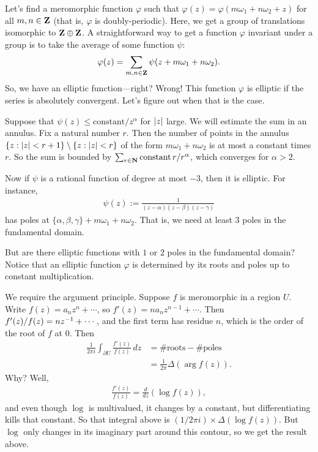 \documentclass[11pt, oneside,margin=1in]{article}
\begin{document}
Let's find a meromorphic function $\varphi$ such that $\varphi(z) = \varphi (m\omega_1 + n\omega_2 + z)$ for all $m,n\in\mathbf Z$ (that is, $\varphi$ is doubly-periodic). Here, we get a group of translations isomorphic to $\mathbf Z\oplus\mathbf Z$. A straightforward way to get a function $\varphi$ invariant under a group is to take the average of some function $\psi$:  
 \begin{align*}
	\varphi(z) = \sum_{m,n\in \mathbf Z} \psi (z+m\omega_1 + n\omega_2).
\end{align*}
So, we have an elliptic function---right? Wrong! This function $\varphi$ is elliptic if the series is absolutely convergent. Let's figure out when that is the case.

Suppose that $\psi(z)\le \textrm{constant}/z^\alpha$ for $\left \lvert z \right \rvert$ large. We will estimate the sum in an annulus. Fix a natural number $r$. Then the number of points in the annulus $\{z : \left \lvert z \right \rvert < r+1\} \setminus \{z : \left \lvert z \right \rvert < r\}$ of the form $m\omega_1 + n\omega_2$ is at most a constant times $r$. So the sum is bounded by $\sum _{r\in \mathbf N} \textrm{constant}\, r/r^\alpha$, which converges for $\alpha>2$.

Now if $\psi$ is a rational function of degree at most $-3$, then it is elliptic. For instance,
\begin{align*}
	\psi(z) := \frac{1}{ (z-\alpha) (z-\beta) (z-\gamma)}
\end{align*}
has poles at $\{\alpha,\beta,\gamma\}+m\omega_1 + n\omega_2$. That is, we need at least $3$ poles in the fundamental domain. 

But are there elliptic functions with $1$ or $2$ poles in the fundamental domain? Notice that an elliptic function $\varphi$ is determined by its roots and poles up to constant multiplication. 

We require the argument principle. Suppose $f$ is meromorphic in a region $U$. Write $f(z) = a_nz^n+\cdots$, so $f'(z) = na_nz^{n-1} + \cdots$. Then $f'(z)/f (z) = nz^{-1} + \cdots$, and the first term has residue $n$, which is the order of the root of $f$ at $0$. Then 
\begin{align*}
\frac{1}{2\pi i} \int_{\partial U} \frac{f'(z)}{f (z)} \, dz &= \# \textrm{roots} - \#\textrm{poles} \\
							     &= \frac{1}{2\pi}\Delta (\arg f(z)).
\end{align*}
Why? Well, 
\begin{align*}
	\frac{f'(z)}{f (z)} = \frac{d}{dz} (\log  f(z)),
\end{align*}
and even though $\log$ is multivalued, it changes by a constant, but differentiating kills that constant. So that integral above is $(1/2\pi i)\times \Delta  (\log f(z))$. But $\log$ only changes in its imaginary part around this contour, so we get the result above.
\end{document}
